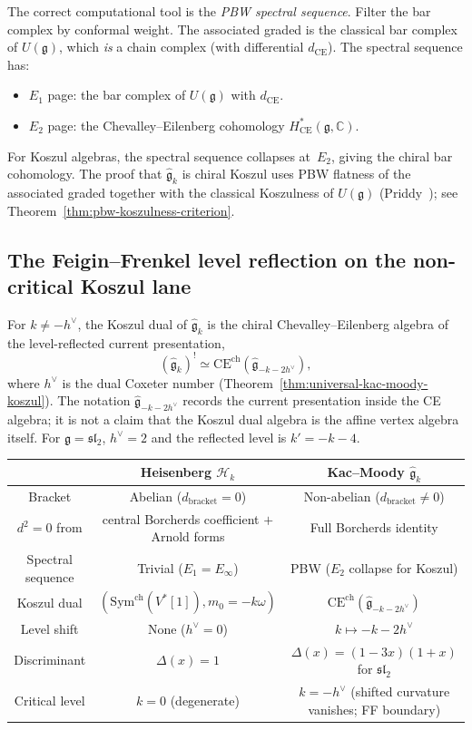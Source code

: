 The correct computational tool is the \emph{PBW spectral sequence}.
Filter the bar complex by conformal weight. The associated graded
is the classical bar complex of $U(\mathfrak{g})$, which \emph{is}
a chain complex (with differential $d_{\mathrm{CE}}$). The
spectral sequence has:
\begin{itemize}
\item $E_1$ page: the bar complex of $U(\mathfrak{g})$ with
 $d_{\mathrm{CE}}$.
\item $E_2$ page: the Chevalley--Eilenberg cohomology
 $H^*_{\mathrm{CE}}(\mathfrak{g}, \mathbb{C})$.
\end{itemize}
For Koszul algebras, the spectral sequence collapses at~$E_2$,
giving the chiral bar cohomology. The proof that
$\widehat{\mathfrak{g}}_k$ is chiral Koszul uses PBW flatness
of the associated graded together with the classical Koszulness
of $U(\mathfrak{g})$ (Priddy~\cite{Priddy70}); see
Theorem~\ref{thm:pbw-koszulness-criterion}.

\subsection{The Feigin--Frenkel level reflection on the non-critical Koszul lane}

For $k\neq -h^\vee$, the Koszul dual of
$\widehat{\mathfrak{g}}_k$ is the chiral Chevalley--Eilenberg
algebra of the level-reflected current presentation,
\[
(\widehat{\mathfrak{g}}_k)^!
\simeq
\mathrm{CE}^{\mathrm{ch}}(\widehat{\mathfrak{g}}_{-k-2h^\vee}),
\]
where $h^\vee$ is the dual Coxeter number
(Theorem~\ref{thm:universal-kac-moody-koszul}). The notation
$\widehat{\mathfrak{g}}_{-k-2h^\vee}$ records the current
presentation inside the CE algebra; it is not a claim that the
Koszul dual algebra is the affine vertex algebra itself. For
$\mathfrak{g} = \mathfrak{sl}_2$, $h^\vee = 2$ and the reflected
level is $k'=-k-4$.

\begin{center}
\small
\begin{tabular}{c|c|c}
& \textbf{Heisenberg} $\mathcal{H}_k$ &
\textbf{Kac--Moody} $\widehat{\mathfrak{g}}_k$ \\
\hline
Bracket & Abelian ($d_{\mathrm{bracket}} = 0$)
 & Non-abelian ($d_{\mathrm{bracket}} \neq 0$) \\
$d^2 = 0$ from & central Borcherds coefficient $+$ Arnold forms
 & Full Borcherds identity \\
Spectral sequence & Trivial ($E_1 = E_\infty$)
 & PBW ($E_2$ collapse for Koszul) \\
Koszul dual & $(\mathrm{Sym}^{\mathrm{ch}}(V^*[1]),m_0=-k\omega)$
 & $\mathrm{CE}^{\mathrm{ch}}(\widehat{\mathfrak{g}}_{-k-2h^\vee})$ \\
Level shift & None ($h^\vee = 0$)
 & $k \mapsto -k - 2h^\vee$ \\
Discriminant & $\Delta(x) = 1$
 & $\Delta(x) = (1-3x)(1+x)$ for $\mathfrak{sl}_2$ \\
Critical level & $k = 0$ (degenerate)
 & $k = -h^\vee$ (shifted curvature vanishes; FF boundary)
\end{tabular}
\end{center}

